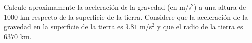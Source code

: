 \noindent Calcule aproximamente la aceleraci\'on de la gravedad (en m/s$^{2}$) a una altura de $1000$ km respecto de la superficie de la tierra. Considere que la aceleración de la gravedad en la superficie de la tierra es $9.81$ m/s$^{2}$ y que el radio de la tierra es $6370$ km. 
